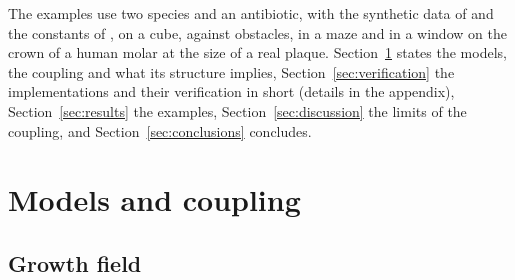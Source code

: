 \documentclass[11pt,a4paper]{article}
\begin{document}
The examples use two species and an antibiotic, with the synthetic data of \citet{Fritsch2025BayesianMicrofilms} and the constants of \citet{Klempt2024DiffusionDrivenGrowth,Klempt2026ContinuumBacterialGrowth}, on a cube, against obstacles, in a maze and in a window on the crown of a human molar at the size of a real plaque.
Section~\ref{sec:models} states the models, the coupling and what its structure implies, Section~\ref{sec:verification} the implementations and their verification in short (details in the appendix), Section~\ref{sec:results} the examples, Section~\ref{sec:discussion} the limits of the coupling, and Section~\ref{sec:conclusions} concludes.

\section{Models and coupling}
\label{sec:models}

\subsection{Growth field}
\label{sec:field}
\end{document}
